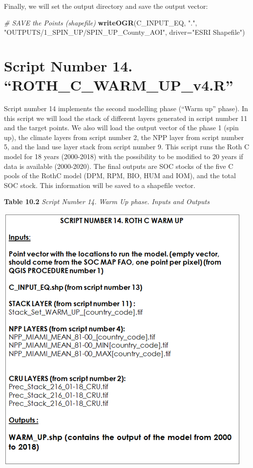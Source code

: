 \documentclass[
  10pt,
  b5paper,
]{book}
\newenvironment{Shaded}{\begin{snugshade}}{\end{snugshade}}
\newcommand{\CommentTok}[1]{\textcolor[rgb]{0.56,0.35,0.01}{\textit{#1}}}
\newcommand{\DataTypeTok}[1]{\textcolor[rgb]{0.13,0.29,0.53}{#1}}
\newcommand{\KeywordTok}[1]{\textcolor[rgb]{0.13,0.29,0.53}{\textbf{#1}}}
\newcommand{\NormalTok}[1]{#1}
\newcommand{\StringTok}[1]{\textcolor[rgb]{0.31,0.60,0.02}{#1}}
\begin{document}
Finally, we will set the output directory and save the output vector:

\begin{Shaded}
\begin{Highlighting}[]
 \CommentTok{# SAVE the Points (shapefile)}
\KeywordTok{writeOGR}\NormalTok{(C_INPUT_EQ, }\StringTok{"."}\NormalTok{, }\StringTok{"OUTPUTS/1_SPIN_UP/SPIN_UP_County_AOI"}\NormalTok{, }\DataTypeTok{driver=}\StringTok{"ESRI Shapefile"}\NormalTok{) }
\end{Highlighting}
\end{Shaded}

\hypertarget{script-number-14.-roth_c_warm_up_v4.r}{%
\section{Script Number 14. ``ROTH\_C\_WARM\_UP\_v4.R''}\label{script-number-14.-roth_c_warm_up_v4.r}}

Script number 14 implements the second modelling phase (``Warm up'' phase). In this script we will load the stack of different layers generated in script number 11 and the target points. We also will load the output vector of the phase 1 (spin up), the climate layers from script number 2, the NPP layer from script number 5, and the land use layer stack from script number 9. This script runs the Roth C model for 18 years (2000-2018) with the possibility to be modified to 20 years if data is available (2000-2020). The final outputs are SOC stocks of the five C pools of the RothC model (DPM, RPM, BIO, HUM and IOM), and the total SOC stock. This information will be saved to a shapefile vector.

\textbf{Table 10.2} \emph{Script Number 14. Warm Up phase. Inputs and Outputs}

\includegraphics{tables/Table_10.2.png}
\end{document}

